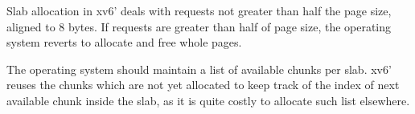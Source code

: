 \documentclass{report}
\newenvironment{hilight}{\color{red}}{\color{black}}
\begin{document}
\begin{hilight}
		Slab allocation in xv6' deals with requests not greater than half the page size, aligned to 8 bytes.
		If requests are greater than half of page size, the operating system reverts to allocate and
		free whole pages.
		
		The operating system should maintain a list of available chunks per slab.  xv6' reuses the chunks
		which are not yet allocated to keep track of the index of next available chunk inside the slab,
		as it is quite costly to allocate such list elsewhere.
	\end{hilight}
\end{document}
